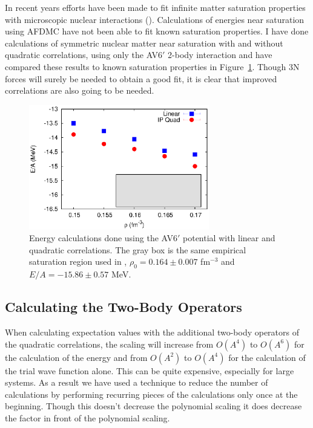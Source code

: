 In recent years efforts have been made to fit infinite matter saturation properties with microscopic nuclear interactions (\cite{drischler2017}). Calculations of energies near saturation using AFDMC have not been able to fit known saturation properties. I have done calculations of symmetric nuclear matter near saturation with and without quadratic correlations, using only the AV6$'$ 2-body interaction and have compared these results to known saturation properties in Figure~\ref{fig:saturation}. Though 3N forces will surely be needed to obtain a good fit, it is clear that improved correlations are also going to be needed.
\begin{figure}[h!]
   \centering
   \includegraphics[width=0.7\textwidth]{figures/saturation.eps}
   \caption{Energy calculations done using the AV6$'$ potential with linear and quadratic correlations. The gray box is the same empirical saturation region used in \cite{drischler2017}, $\rho_0 = 0.164 \pm 0.007$ fm$^{-3}$ and $E/A=-15.86 \pm 0.57$ MeV.}
   \label{fig:saturation}
\end{figure}

\subsection{Calculating the Two-Body Operators}
When calculating expectation values with the additional two-body operators of the quadratic correlations, the scaling will increase from $O(A^4)$ to $O(A^6)$ for the calculation of the energy and from $O(A^2)$ to $O(A^4)$ for the calculation of the trial wave function alone. This can be quite expensive, especially for large systems. As a result we have used a technique to reduce the number of calculations by performing recurring pieces of the calculations only once at the beginning. Though this doesn't decrease the polynomial scaling it does decrease the factor in front of the polynomial scaling.

